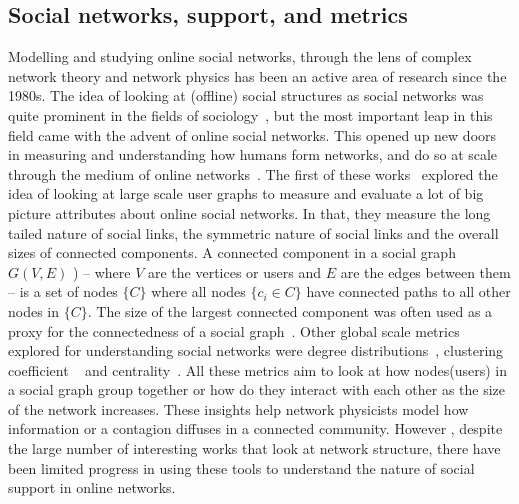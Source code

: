 \subsection{Social networks, support, and metrics}
Modelling and studying online social networks, through the lens of complex network theory and network physics has been an active area of research since the 1980s. The idea of looking at (offline) social structures as social networks was quite prominent in the fields of sociology~\cite{scott1988social}, but the most important leap in this field came with the advent of online social networks. This opened up new doors in measuring and understanding how humans form networks, and do so at scale through the medium of online networks~\cite{mislove2007measurement}. The first of these works~\cite{mislove2007measurement} explored the idea of looking at large scale user graphs to measure and evaluate a lot of big picture attributes about online social networks. In that, they measure the long tailed nature of social links, the symmetric nature of social links and the overall sizes of connected components.
A connected component in a social graph $G(V,E)$ ) -- where $V$ are the vertices or users and $E$ are the edges between them -- is a set of nodes $\{C\}$ where all nodes $\{c_i \in C\}$ have connected paths to all other nodes in $\{C\}$. The size of the largest connected component was often used as a proxy for the connectedness of a social graph~\cite{myers2014information,traud2012social,woodhouse1994mapping}.
Other global scale metrics explored for understanding social networks were degree distributions~\cite{muchnik2013origins,newman2002random, kossinets2006empirical}, clustering coefficient ~\cite{opsahl2013triadic, toivonen2006model} and centrality~\cite{opsahl2010node, borgatti2009network}. All these metrics aim to look at how nodes(users) in a social graph group together or how do they interact with each other as the size of the network increases. 
These insights help network physicists model how information or a contagion diffuses in a connected community. However , despite the large number of interesting works that look at network structure, there have been limited progress in using these tools to understand the nature of social support in online networks.

